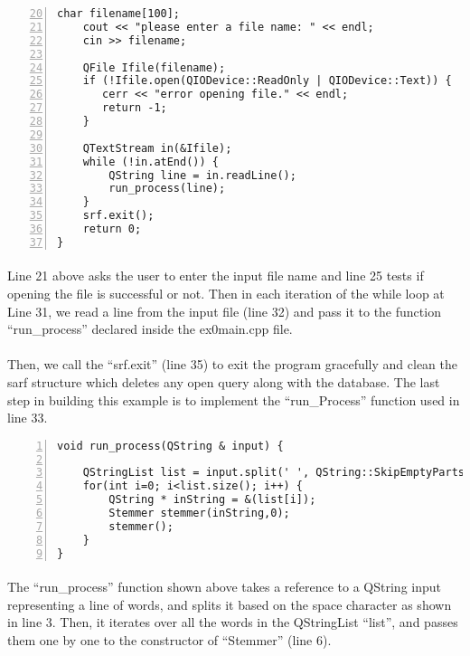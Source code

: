 \documentclass{article}
\begin{document}
\begin{Verbatim}[numbers=left,firstnumber=20]
    char filename[100];
    cout << "please enter a file name: " << endl;
    cin >> filename;

    QFile Ifile(filename);
    if (!Ifile.open(QIODevice::ReadOnly | QIODevice::Text)) {
       cerr << "error opening file." << endl;
       return -1;
    }

    QTextStream in(&Ifile);
    while (!in.atEnd()) {
        QString line = in.readLine();
        run_process(line);
    }
    srf.exit();
    return 0;
}
\end{Verbatim}

\paragraph{}
Line 21 above asks the user to enter the input file name and line 25 tests if opening the file is successful or not. Then in each iteration of the while loop at Line 31, we read a line from the 
input file (line 32) and pass it to the function ``run\_process'' declared inside the ex0main.cpp file.

\paragraph{}
Then,  we call the ``srf.exit'' (line 35) to exit the program gracefully and clean the sarf structure which deletes any open query along with the database. The last step in building this example is to implement the ``run\_Process'' function used in line 33.

\begin{Verbatim}[numbers=left]
void run_process(QString & input) {

    QStringList list = input.split(' ', QString::SkipEmptyParts);
    for(int i=0; i<list.size(); i++) {
        QString * inString = &(list[i]);
        Stemmer stemmer(inString,0);
        stemmer();
    }
}
\end{Verbatim}

\paragraph{}
The ``run\_process'' function shown above takes a reference to a QString input representing a line of words, and splits it based on the space character as shown in line 3. Then, it iterates over all the words in the QStringList ``list'', and passes them one by one to the constructor of ``Stemmer'' (line 6).
\end{document}

